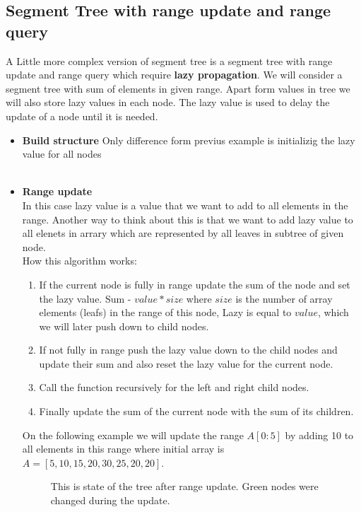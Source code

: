 \documentclass{article}
\begin{document}
\subsection{Segment Tree with range update and range query}
A Little more complex version of segment tree is a segment tree with range update and range query which require \textbf{lazy propagation}.
We will consider a segment tree with sum of elements in given range. 
Apart form values in tree we will also store lazy values in each node.
The lazy value is used to delay the update of a node until it is needed.
\begin{itemize}
    \item \textbf{Build structure} 
    Only difference form previus example is initializig the lazy value for all nodes \\
    \\


    \item \textbf{Range update} \\
    In this case lazy value is a value that we want to add to all elements in the range.
    Another way to think about this is that we want to add lazy value to all elenets in arrary 
    which are represented by all leaves in subtree of given node.
     \\
    How this algorithm works:
    \begin{enumerate}
        \item If the current node is fully in range update the sum of the node and set the lazy value. Sum - $value*size$ where $size$ is the number of array elements (leafs) in the range of this node, Lazy is equal to $value$, which we will later push down to child nodes.
        \item If not fully in range push the lazy value down to the child nodes and update their sum and also reset the lazy value for the current node.
        \item Call the function recursively for the left and right child nodes.
        \item Finally update the sum of the current node with the sum of its children.
    \end{enumerate}
    On the following example we will update the range \(A[0:5]\) by adding 10 to all elements in this range
    where initial array is \(A = [5, 10, 15, 20, 30, 25, 20, 20]\).
    
    \begin{figure}[H]
        \centering
        
        \caption{This is state of the tree after range update. Green nodes were changed during the update.}
        \label{fig:segment_tree_4}
    \end{figure}


\end{itemize}
\end{document}
